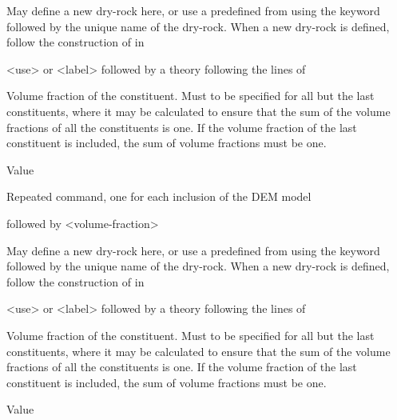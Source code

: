 {
 \slist
   \item \Description  May define a new dry-rock here, or use a predefined  from  using the keyword  followed by the unique name of the dry-rock. When a new dry-rock is defined, follow the construction of  in 
   \item \Argument <use> or <label> followed by a theory following the lines of 
   \item \Default
 \elist

 \slist
   \item \Description Volume fraction of the constituent. Must to be specified for all but the last constituents, where it may be calculated to ensure that the sum of the volume fractions of all the constituents is one. If the volume fraction of the last constituent is included, the sum of volume fractions must be one.
   \item \Argument Value
   \item \Default
 \elist

 \slist
   \item \Description Repeated command, one for each inclusion of the DEM model
   \item {} followed by <volume-fraction>
   \item \Default
 \elist

 \slist
   \item \Description  May define a new dry-rock here, or use a predefined  from  using the keyword  followed by the unique name of the dry-rock. When a new dry-rock is defined, follow the construction of  in 
   \item \Argument <use> or <label> followed by a theory following the lines of 
   \item \Default
 \elist

 \slist
   \item \Description Volume fraction of the constituent. Must to be specified for all but the last constituents, where it may be calculated to ensure that the sum of the volume fractions of all the constituents is one. If the volume fraction of the last constituent is included, the sum of volume fractions must be one.
   \item \Argument Value
   \item \Default
 \elist

}
